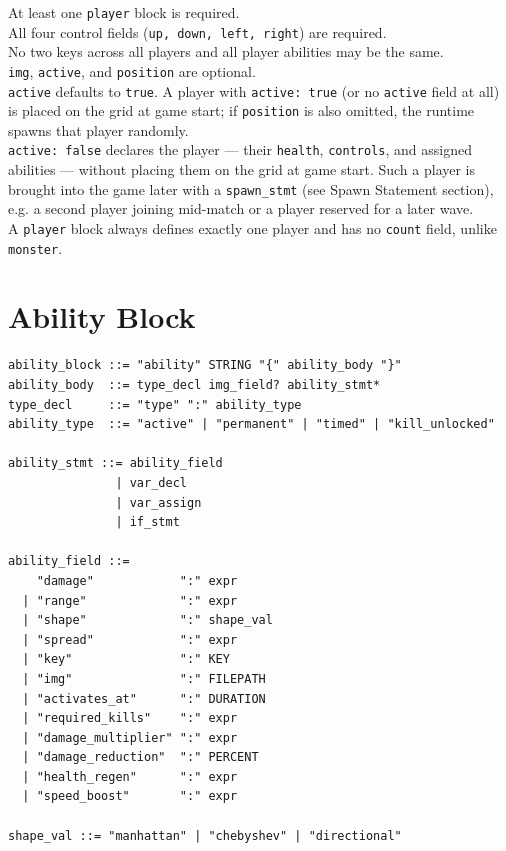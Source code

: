 \documentclass[12pt,a4paper]{article}
\begin{document}
\begin{cbox}
At least one \texttt{player} block is required.\\
All four control fields (\texttt{up, down, left, right}) are required.\\
No two keys across all players and all player abilities may be the same.\\
\texttt{img}, \texttt{active}, and \texttt{position} are optional.\\
\texttt{active} defaults to \texttt{true}. A player with \texttt{active: true}
(or no \texttt{active} field at all) is placed on the grid at game start;
if \texttt{position} is also omitted, the runtime spawns that player
randomly.\\
\texttt{active: false} declares the player --- their \texttt{health},
\texttt{controls}, and assigned abilities --- without placing them on
the grid at game start. Such a player is brought into the game later
with a \texttt{spawn\_stmt} (see Spawn Statement section), e.g. a
second player joining mid-match or a player reserved for a later wave.\\
A \texttt{player} block always defines exactly one player and has no
\texttt{count} field, unlike \texttt{monster}.
\end{cbox}

\section{Ability Block}

\begin{lstlisting}[style=bnf]
ability_block ::= "ability" STRING "{" ability_body "}"
ability_body  ::= type_decl img_field? ability_stmt*
type_decl     ::= "type" ":" ability_type
ability_type  ::= "active" | "permanent" | "timed" | "kill_unlocked"

ability_stmt ::= ability_field
               | var_decl
               | var_assign
               | if_stmt

ability_field ::=
    "damage"            ":" expr
  | "range"             ":" expr
  | "shape"             ":" shape_val
  | "spread"            ":" expr
  | "key"               ":" KEY
  | "img"               ":" FILEPATH
  | "activates_at"      ":" DURATION
  | "required_kills"    ":" expr
  | "damage_multiplier" ":" expr
  | "damage_reduction"  ":" PERCENT
  | "health_regen"      ":" expr
  | "speed_boost"       ":" expr

shape_val ::= "manhattan" | "chebyshev" | "directional"
\end{lstlisting}
\end{document}
